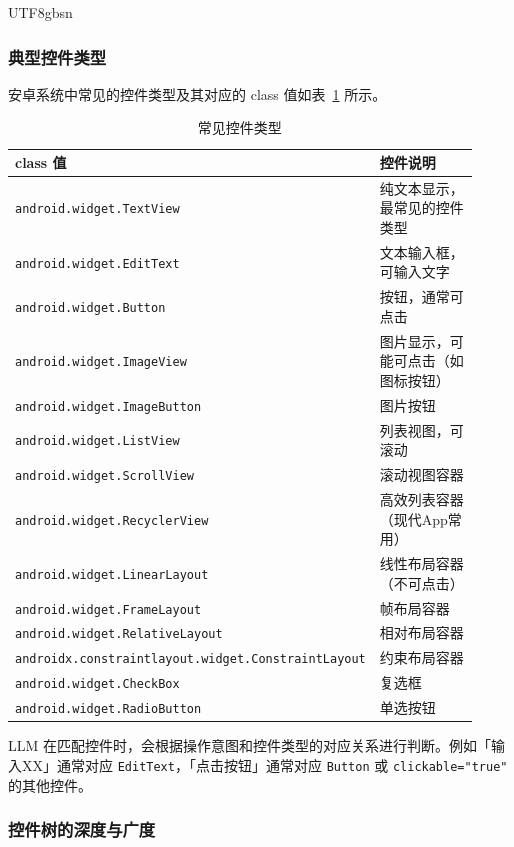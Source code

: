 \documentclass{article}
\begin{document}
\begin{CJK}{UTF8}{gbsn}
\subsubsection{典型控件类型}

安卓系统中常见的控件类型及其对应的 class 值如表~\ref{tab:widget_types} 所示。

\begin{table}[h]
  \centering
  \caption{常见控件类型}
  \label{tab:widget_types}
  \begin{tabular}{p{0.4\linewidth}p{0.52\linewidth}}
    \toprule
    class 值 & 控件说明 \\
    \midrule
    \texttt{android.widget.TextView} & 纯文本显示，最常见的控件类型 \\
    \texttt{android.widget.EditText} & 文本输入框，可输入文字 \\
    \texttt{android.widget.Button} & 按钮，通常可点击 \\
    \texttt{android.widget.ImageView} & 图片显示，可能可点击（如图标按钮）\\
    \texttt{android.widget.ImageButton} & 图片按钮 \\
    \texttt{android.widget.ListView} & 列表视图，可滚动 \\
    \texttt{android.widget.ScrollView} & 滚动视图容器 \\
    \texttt{android.widget.RecyclerView} & 高效列表容器（现代App常用）\\
    \texttt{android.widget.LinearLayout} & 线性布局容器（不可点击）\\
    \texttt{android.widget.FrameLayout} & 帧布局容器 \\
    \texttt{android.widget.RelativeLayout} & 相对布局容器 \\
    \texttt{androidx.constraintlayout.widget.ConstraintLayout} & 约束布局容器 \\
    \texttt{android.widget.CheckBox} & 复选框 \\
    \texttt{android.widget.RadioButton} & 单选按钮 \\
    \bottomrule
  \end{tabular}
\end{table}

LLM 在匹配控件时，会根据操作意图和控件类型的对应关系进行判断。例如「输入XX」通常对应 \texttt{EditText}，「点击按钮」通常对应 \texttt{Button} 或 \texttt{clickable="true"} 的其他控件。

\subsubsection{控件树的深度与广度}


\end{CJK}
\end{document}
